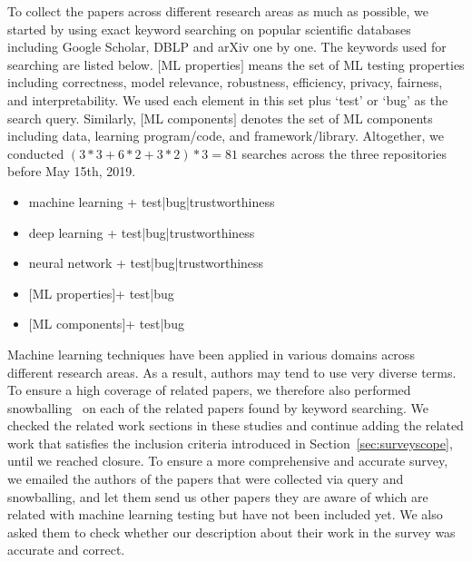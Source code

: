 \label{sec:papercollection}
To collect the papers across different research areas as much as possible,
we started by using exact keyword searching on popular scientific databases including Google Scholar, DBLP and arXiv one by one.
The keywords used for searching are listed below.
$[$ML properties$]$ means the set of ML testing properties including correctness, 
model relevance, robustness, efficiency, privacy, fairness, and interpretability.
We used each element in this set plus `test' or `bug' as the search query.
Similarly, $[$ML components$]$ denotes the set of ML components including data, learning program/code, and framework/library.
Altogether, we conducted $(3*3+6*2+3*2)*3=81$ searches across the three repositories before May 15th, 2019.
\begin{itemize}
	\item machine learning + test|bug|trustworthiness 
	\item deep learning + test|bug|trustworthiness
	\item neural network + test|bug|trustworthiness
	\item $[$ML properties$]$+ test|bug 
	\item $[$ML components$]$+ test|bug 	
\end{itemize}
Machine learning techniques have been applied in various domains across different research areas.
As a result, authors may tend to use very diverse terms.  
To ensure a high coverage of \mlt{} related papers,
we therefore also performed snowballing~ on each of the related
papers found by keyword searching. 
We checked the related work sections in these studies and continue adding the related work that satisfies the inclusion criteria introduced in Section~\ref{sec:surveyscope}, until we reached closure.
To ensure a more comprehensive and accurate survey, we emailed the authors of the papers that were collected via query and snowballing,
and let them send us other papers they are aware of which are related with machine learning testing but have not been included yet. 
We also asked them to check whether our description about their work in the survey was accurate and correct.
